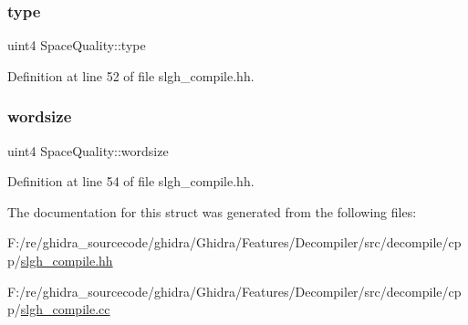 \subsubsection{\texorpdfstring{type}{type}}
{\footnotesize\ttfamily uint4 Space\+Quality\+::type}



Definition at line 52 of file slgh\+\_\+compile.\+hh.

\mbox{\label{struct_space_quality_af5ee1ab18c74388b5fb952f4187e912a}} 
\subsubsection{\texorpdfstring{wordsize}{wordsize}}
{\footnotesize\ttfamily uint4 Space\+Quality\+::wordsize}



Definition at line 54 of file slgh\+\_\+compile.\+hh.



The documentation for this struct was generated from the following files\+:\begin{DoxyCompactItemize}
\item 
F\+:/re/ghidra\+\_\+sourcecode/ghidra/\+Ghidra/\+Features/\+Decompiler/src/decompile/cpp/\mbox{\hyperlink{slgh__compile_8hh}{slgh\+\_\+compile.\+hh}}\item 
F\+:/re/ghidra\+\_\+sourcecode/ghidra/\+Ghidra/\+Features/\+Decompiler/src/decompile/cpp/\mbox{\hyperlink{slgh__compile_8cc}{slgh\+\_\+compile.\+cc}}\end{DoxyCompactItemize}
